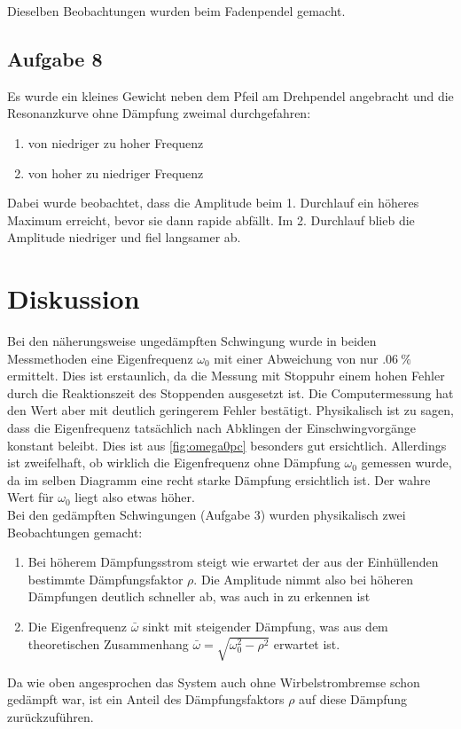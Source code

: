 Dieselben Beobachtungen wurden beim Fadenpendel gemacht.
\subsection{Aufgabe 8}
Es wurde ein kleines Gewicht neben dem Pfeil am Drehpendel angebracht und die Resonanzkurve ohne Dämpfung zweimal durchgefahren:
\begin{enumerate}
  \item von niedriger zu hoher Frequenz 
  \item von hoher zu niedriger Frequenz
\end{enumerate}
Dabei wurde beobachtet, dass die Amplitude beim 1. Durchlauf ein höheres Maximum erreicht, bevor sie dann rapide abfällt.
Im 2. Durchlauf blieb die Amplitude niedriger und fiel langsamer ab.
\section{Diskussion}
Bei den näherungsweise ungedämpften Schwingung wurde in beiden Messmethoden eine Eigenfrequenz $\omega_0$ mit einer Abweichung von nur $\SI{.06}{\percent}$ ermittelt. Dies ist erstaunlich, da die Messung mit Stoppuhr einem hohen Fehler durch die Reaktionszeit des Stoppenden ausgesetzt ist. Die Computermessung hat den Wert aber mit deutlich geringerem Fehler bestätigt. 
Physikalisch ist zu sagen, dass die Eigenfrequenz tatsächlich nach Abklingen der Einschwingvorgänge konstant beleibt. Dies ist aus \cref{fig:omega0pc} besonders gut ersichtlich. Allerdings ist zweifelhaft, ob wirklich die Eigenfrequenz ohne Dämpfung $\omega_0$ gemessen wurde, da im selben Diagramm eine recht starke Dämpfung ersichtlich ist. Der wahre Wert für $\omega_0$ liegt also etwas höher.\\

Bei den gedämpften Schwingungen (Aufgabe 3) wurden physikalisch zwei Beobachtungen gemacht:
\begin{enumerate}
  \item Bei höherem Dämpfungsstrom steigt wie erwartet der aus der Einhüllenden bestimmte Dämpfungsfaktor $\rho$. Die Amplitude nimmt also bei höheren Dämpfungen deutlich schneller ab, was auch in  zu erkennen ist
  \item Die Eigenfrequenz $\bar{\omega}$ sinkt mit steigender Dämpfung, was aus dem theoretischen Zusammenhang $\bar{\omega}=\sqrt{\omega_0^2-\rho^2}$ erwartet ist. 
\end{enumerate}
Da wie oben angesprochen das System auch ohne Wirbelstrombremse schon gedämpft war, ist ein Anteil des Dämpfungsfaktors $\rho$ auf diese Dämpfung zurückzuführen.\\

